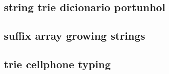 \subsection{string trie dicionario portunhol}
\raggedbottom
\clearpage
\subsection{suffix array growing strings}
\raggedbottom
\clearpage
\subsection{trie cellphone typing}
\raggedbottom
\clearpage
\clearpage
